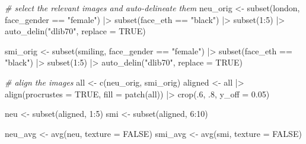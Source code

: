 \documentclass[
  man,floatsintext]{apa6}
\newenvironment{Shaded}{\begin{snugshade}}{\end{snugshade}}
\newcommand{\AttributeTok}[1]{\textcolor[rgb]{0.77,0.63,0.00}{#1}}
\newcommand{\CommentTok}[1]{\textcolor[rgb]{0.56,0.35,0.01}{\textit{#1}}}
\newcommand{\ConstantTok}[1]{\textcolor[rgb]{0.00,0.00,0.00}{#1}}
\newcommand{\DecValTok}[1]{\textcolor[rgb]{0.00,0.00,0.81}{#1}}
\newcommand{\FloatTok}[1]{\textcolor[rgb]{0.00,0.00,0.81}{#1}}
\newcommand{\FunctionTok}[1]{\textcolor[rgb]{0.00,0.00,0.00}{#1}}
\newcommand{\NormalTok}[1]{#1}
\newcommand{\OtherTok}[1]{\textcolor[rgb]{0.56,0.35,0.01}{#1}}
\newcommand{\SpecialCharTok}[1]{\textcolor[rgb]{0.00,0.00,0.00}{#1}}
\newcommand{\StringTok}[1]{\textcolor[rgb]{0.31,0.60,0.02}{#1}}
\begin{document}
\begin{Shaded}
\begin{Highlighting}[]
\CommentTok{\# select the relevant images and auto{-}delineate them}
\NormalTok{neu\_orig }\OtherTok{\textless{}{-}} \FunctionTok{subset}\NormalTok{(london, face\_gender }\SpecialCharTok{==} \StringTok{"female"}\NormalTok{) }\SpecialCharTok{|\textgreater{}} 
  \FunctionTok{subset}\NormalTok{(face\_eth }\SpecialCharTok{==} \StringTok{"black"}\NormalTok{) }\SpecialCharTok{|\textgreater{}} \FunctionTok{subset}\NormalTok{(}\DecValTok{1}\SpecialCharTok{:}\DecValTok{5}\NormalTok{) }\SpecialCharTok{|\textgreater{}}
  \FunctionTok{auto\_delin}\NormalTok{(}\StringTok{"dlib70"}\NormalTok{, }\AttributeTok{replace =} \ConstantTok{TRUE}\NormalTok{)}

\NormalTok{smi\_orig }\OtherTok{\textless{}{-}} \FunctionTok{subset}\NormalTok{(smiling, face\_gender }\SpecialCharTok{==} \StringTok{"female"}\NormalTok{) }\SpecialCharTok{|\textgreater{}} 
  \FunctionTok{subset}\NormalTok{(face\_eth }\SpecialCharTok{==} \StringTok{"black"}\NormalTok{) }\SpecialCharTok{|\textgreater{}} \FunctionTok{subset}\NormalTok{(}\DecValTok{1}\SpecialCharTok{:}\DecValTok{5}\NormalTok{) }\SpecialCharTok{|\textgreater{}}
  \FunctionTok{auto\_delin}\NormalTok{(}\StringTok{"dlib70"}\NormalTok{, }\AttributeTok{replace =} \ConstantTok{TRUE}\NormalTok{)}

\CommentTok{\# align the images}
\NormalTok{all }\OtherTok{\textless{}{-}} \FunctionTok{c}\NormalTok{(neu\_orig, smi\_orig) }
\NormalTok{aligned }\OtherTok{\textless{}{-}}\NormalTok{ all }\SpecialCharTok{|\textgreater{}}
  \FunctionTok{align}\NormalTok{(}\AttributeTok{procrustes =} \ConstantTok{TRUE}\NormalTok{, }\AttributeTok{fill =} \FunctionTok{patch}\NormalTok{(all)) }\SpecialCharTok{|\textgreater{}}
  \FunctionTok{crop}\NormalTok{(.}\DecValTok{6}\NormalTok{, .}\DecValTok{8}\NormalTok{, }\AttributeTok{y\_off =} \FloatTok{0.05}\NormalTok{)}

\NormalTok{neu }\OtherTok{\textless{}{-}} \FunctionTok{subset}\NormalTok{(aligned, }\DecValTok{1}\SpecialCharTok{:}\DecValTok{5}\NormalTok{)}
\NormalTok{smi }\OtherTok{\textless{}{-}} \FunctionTok{subset}\NormalTok{(aligned, }\DecValTok{6}\SpecialCharTok{:}\DecValTok{10}\NormalTok{)}

\NormalTok{neu\_avg }\OtherTok{\textless{}{-}} \FunctionTok{avg}\NormalTok{(neu, }\AttributeTok{texture =} \ConstantTok{FALSE}\NormalTok{)}
\NormalTok{smi\_avg }\OtherTok{\textless{}{-}} \FunctionTok{avg}\NormalTok{(smi, }\AttributeTok{texture =} \ConstantTok{FALSE}\NormalTok{)}
\end{Highlighting}
\end{Shaded}
\end{document}
